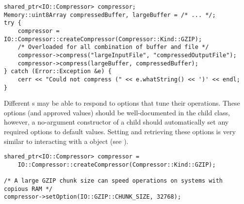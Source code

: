 \begin{lstlisting}[caption={Using a \class{Compressor} Object}, label=lst:compressoruse]
shared_ptr<IO::Compressor> compressor;
Memory::uint8Array compressedBuffer, largeBuffer = /* ... */;
try {
	compressor = IO::Compressor::createCompressor(Compressor::Kind::GZIP);
	/* Overloaded for all combination of buffer and file */
	compressor->compress("largeInputFile", "compressedOutputFile");
	compressor->compress(largeBuffer, compressedBuffer);
} catch (Error::Exception &e) {
	cerr << "Could not compress (" << e.whatString() << ')' << endl;
}
\end{lstlisting}

Different s may be able to respond to options that tune their
operations.  These options (and approved values) should be well-documented
in the child class, however, a no-argument constructor of a child
 should automatically set any required options to default
values.  Setting and retrieving these options is very similar to interacting
with a  object (see ).

\begin{lstlisting}[caption={Setting \class{Compressor} Options}, label=lst:compressoroptions]
shared_ptr<IO::Compressor> compressor =
    IO::Compressor::createCompressor(Compressor::Kind::GZIP);

/* A large GZIP chunk size can speed operations on systems with copious RAM */
compressor->setOption(IO::GZIP::CHUNK_SIZE, 32768);

\end{lstlisting}
